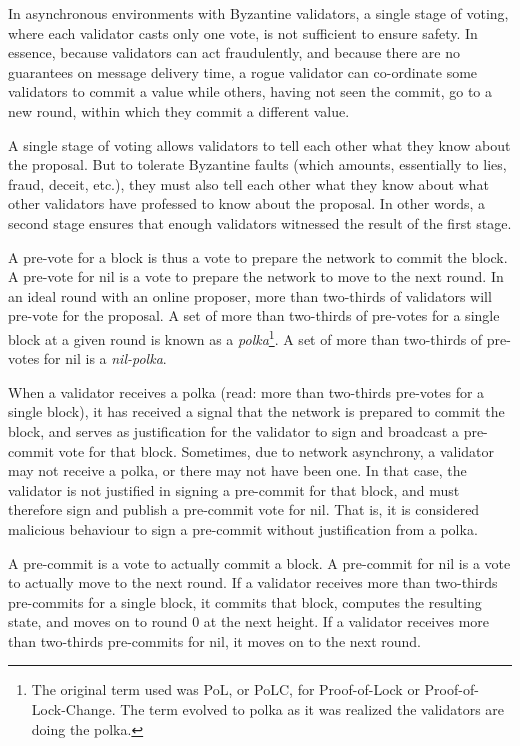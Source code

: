 In asynchronous environments with Byzantine validators, 
a single stage of voting, where each validator casts only one vote,
is not sufficient to ensure safety.
In essence, because validators can act fraudulently, 
and because there are no guarantees on message delivery time,
a rogue validator can co-ordinate some validators to commit a value
while others, having not seen the commit, 
go to a new round, within which they commit a different value.

A single stage of voting allows validators to tell each other what they know about the proposal.	
But to tolerate Byzantine faults (which amounts, essentially to lies, fraud, deceit, etc.), 
they must also tell each other what they know about what other validators have professed to know about the proposal.
In other words, a second stage ensures that enough validators witnessed the result of the first stage.

A pre-vote for a block is thus a vote to prepare the network to commit the block.
A pre-vote for nil is a vote to prepare the network to move to the next round.
In an ideal round with an online proposer, more than two-thirds of validators will pre-vote for the proposal.
A set of more than two-thirds of pre-votes for a single block at a given round is known as a \emph{polka}\footnote{The original term used was PoL, or PoLC, for Proof-of-Lock or Proof-of-Lock-Change. The term evolved to polka as it was realized the validators are doing the polka.}.
A set of more than two-thirds of pre-votes for nil is a \emph{nil-polka}.

When a validator receives a polka (read: more than two-thirds pre-votes for a single block), 
it has received a signal that the network is prepared to commit the block,
and serves as justification for the validator to sign and broadcast a pre-commit vote for that block.
Sometimes, due to network asynchrony, a validator may not receive a polka, or there may not have been one. 
In that case, the validator is not justified in signing a pre-commit for that block, 
and must therefore sign and publish a pre-commit vote for nil.
That is, it is considered malicious behaviour to sign a pre-commit without justification from a polka.

A pre-commit is a vote to actually commit a block.
A pre-commit for nil is a vote to actually move to the next round.
If a validator receives more than two-thirds pre-commits for a single block, 
it commits that block, computes the resulting state,
and moves on to round 0 at the next height.
If a validator receives more than two-thirds pre-commits for nil,
it moves on to the next round.

